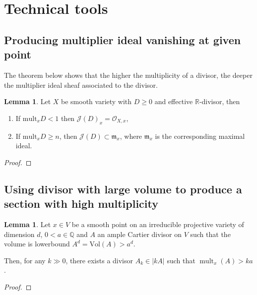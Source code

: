 \documentclass[11pt]{article}
\theoremstyle{definition}
\newtheorem{lemma}[theorem]{Lemma}
\begin{document}
	
	\section{Technical tools}
	\subsection{Producing multiplier ideal vanishing at given point}
	The theorem below shows that the higher the multiplicity of a divisor, the deeper the multiplier ideal sheaf associated to the divisor.
	\begin{lemma}
		Let $X$ be smooth variety with $D\ge 0$ and effective $\mathbb{R}$-divisor, then 
		
		\begin{enumerate}
			\item If $\text{mult}_x D<1$ then $\mathcal{J}(D)_x = \mathcal{O}_{X,x}$,
			\item If $\text{mult}_x D \geq n$, then $\mathcal{J}(D) \subset \mathfrak{m}_x$, where $\mathfrak{m}_x$ is the corresponding maximal ideal.
		\end{enumerate}
	\end{lemma}
	\begin{proof}
		
	\end{proof}
	\subsection{Using divisor with large volume to produce a section with high multiplicity}
	\begin{lemma}
		Let $x \in V$ be a smooth point on an irreducible projective variety of dimension $d$, $0<a \in \mathbb{Q}$ and $A$ an ample Cartier divisor on $V$ such that the volume is lowerbound $A^d = \text{Vol}(A)>a^d$. 
		
		Then, for any $k \gg 0$, there exists a divisor $A_k \in|k A|$ such that $\operatorname{mult}_x(A)>k a$.
	\end{lemma}
	\begin{proof}
		
	\end{proof}
\end{document}
